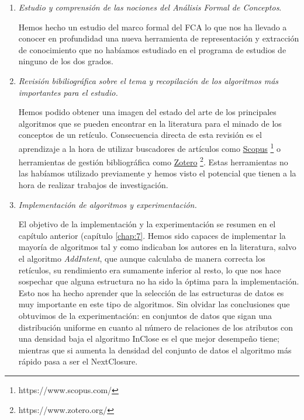 \documentclass[oneside,openright,titlepage,numbers=noenddot,openany,headinclude,footinclude=true,
cleardoublepage=empty,abstractoff,BCOR=5mm,paper=a4,fontsize=12pt,main=spanish]{scrreprt}
\begin{document}
\begin{enumerate}
    \item \textit{Estudio y comprensión de las nociones del Análisis Formal de Conceptos}.
    
    Hemos hecho un estudio del marco formal del FCA lo que nos ha llevado a conocer en profundidad una nueva herramienta de representación y extracción de conocimiento que no habíamos estudiado en el programa de estudios de ninguno de los dos grados.\\
    
    \item \textit{Revisión bibiliográfica sobre el tema y recopilación de los algoritmos más importantes para el estudio.}
    
    Hemos podido obtener una imagen del estado del arte de los principales algoritmos que se pueden encontrar en la literatura para el minado de los conceptos de un retículo. Consecuencia directa de esta revisión es el aprendizaje a la hora de utilizar buscadores de artículos como \href{https://www.scopus.com/}{Scopus} \footnote{https://www.scopus.com/} o herramientas de gestión bibliográfica como \href{https://www.zotero.org/}{Zotero} \footnote{https://www.zotero.org/}. Estas herramientas no las habíamos utilizado previamente y hemos visto el potencial que tienen a la hora de realizar trabajos de investigación.\\
    
    \item \textit{Implementación de algoritmos y experimentación.}
    
    El objetivo de la implementación y la experimentación se resumen en el capítulo anterior (capítulo \ref{chap:7}. Hemos sido capaces de implementar la mayoría de algoritmos tal y como indicaban los autores en la literatura, salvo el algoritmo \textit{AddIntent}, que aunque calculaba de manera correcta los retículos, su rendimiento era sumamente inferior al resto, lo que nos hace sospechar que alguna estructura no ha sido la óptima para la implementación. Esto nos ha hecho aprender que la selección de las estructuras de datos es muy importante en este tipo de algoritmos. Sin olvidar las conclusiones que obtuvimos de la experimentación: en conjuntos de datos que sigan una distribución uniforme en cuanto al número de relaciones de los atributos con una densidad baja el algoritmo InClose es el que mejor desempeño tiene; mientras que si aumenta la densidad del conjunto de datos el algoritmo más rápido pasa a ser el NextClosure.\\
    

\end{enumerate}
\end{document}
